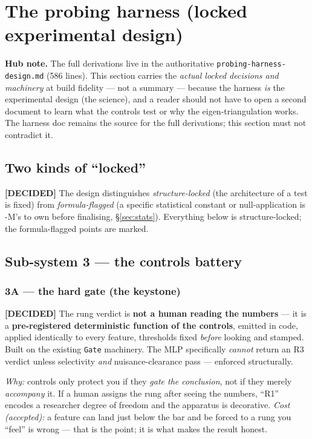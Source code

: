 \documentclass[11pt,a4paper]{article}
\newcommand{\dec}{\textcolor{decided}{\sffamily\bfseries[DECIDED]}}
\begin{document}
\section{The probing harness (locked experimental design)}\label{sec:harness}

\begin{decidedbox}
\textbf{Hub note.} The full derivations live in the authoritative
\texttt{probing-harness-design.md} (586 lines). This section carries the \emph{actual locked
decisions and machinery} at build fidelity --- not a summary --- because the harness \emph{is}
the experimental design (the science), and a reader should not have to open a second document to
learn what the controls test or why the eigen-triangulation works. The harness doc remains the
source for the full derivations; this section must not contradict it.
\end{decidedbox}

\subsection{Two kinds of ``locked''}
\dec{} The design distinguishes \emph{structure-locked} (the architecture of a test is fixed)
from \emph{formula-flagged} (a specific statistical constant or null-application is -M's to own
before finalising, \S\ref{sec:stats}). Everything below is structure-locked; the formula-flagged
points are marked.

\subsection{Sub-system 3 --- the controls battery}\label{sub:controls-battery}

\subsubsection{3A --- the hard gate (the keystone)}
\dec{} The rung verdict is \textbf{not a human reading the numbers} --- it is a
\textbf{pre-registered deterministic function of the controls}, emitted in code, applied
identically to every feature, thresholds fixed \emph{before} looking and stamped. Built on the
existing \texttt{Gate} machinery. The MLP specifically \emph{cannot} return an R3 verdict unless
selectivity \emph{and} nuisance-clearance pass --- enforced structurally.

\emph{Why:} controls only protect you if they \emph{gate the conclusion}, not if they merely
\emph{accompany} it. If a human assigns the rung after seeing the numbers, ``R1'' encodes a
researcher degree of freedom and the apparatus is decorative. \emph{Cost (accepted):} a feature
can land just below the bar and be forced to a rung you ``feel'' is wrong --- that is the point;
it is what makes the result honest.
\end{document}
